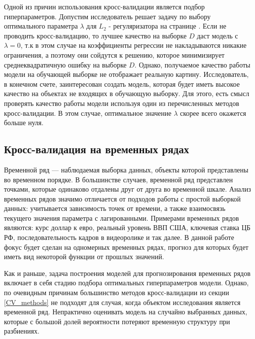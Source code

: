 \documentclass[a4paper, 14pt]{article}
\begin{document}
Одной из причин использования кросс-валидации является подбор гиперпараметров. Допустим исследователь решает задачу по выбору оптимального параметра $\lambda$ для $L_2$ - регуляризатора на странице \pageref{ridge}. Если не проводить кросс-валидацию, то лучшее качество на выборке $D$ даст модель с $\lambda = 0$, т.к в этом случае на коэффициенты регрессии не накладываются никакие ограничения, а поэтому они сойдутся к решению, которое минимизирует среднеквадратичную ошибку на выборке $D$. Однако, получаемое качество работы модели на обучающей выборке не отображает реальную картину. Исследователь, в конечном счете, заинтересован создать модель, которая будет иметь высокое качество на объектах не входящих в обучающую выборку. Для этого, есть смысл проверять качество работы модели используя один из перечисленных методов кросс-валидации. В этом случае, оптимальное значение $\lambda$ скорее всего окажется больше нуля.

\subsection{Кросс-валидация на временных рядах}

Временной ряд --- наблюдаемая выборка данных, объекты которой представлены во временном порядке. В большинстве случаев, временной ряд представлен точками, которые одинаково отдалены друг от друга во временной шкале. Анализ временных рядов значимо отличается от подходов работы с простой выборкой данных:  учитывается зависимость точек от времени, а также взаимосвязь текущего значения параметра с лагированными. Примерами временных рядов являются: курс доллар к евро, реальный уровень ВВП США, ключевая ставка ЦБ РФ, последовательность кадров в видеоролике и так далее. В данной работе фокус будет сделан на одномерных временных рядах, прогноз для которых будет иметь вид некоторой функции от прошлых значений. 

Как и раньше, задача построения моделей для прогнозирования временных рядов включает в себя стадию подбора оптимальных гиперпараметров модели. Однако, по очевидным причинам большинство методов кросс-валидации из секции \ref{CV_methods} не подходят для случая, когда объектом исследования является временной ряд. Непрактично оценивать модель на случайно выбранных данных, которые с большой долей вероятности потеряют временную структуру при разбиениях. 



\newpage
\end{document}
